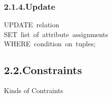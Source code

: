 \documentclass{article}
\begin{document}
\subsubsection{2.1.4.\hspace*{0.5em}Update}\label{sec-update}%
\begin{mdpre}%
\noindent UPDATE~relation\\
SET~list~of~attribute~assignments\\
WHERE~condition~on~tuples;%
\end{mdpre}
\subsection{2.2.\hspace*{0.5em}Constraints}\label{sec-constraints}%

\noindent{}Kinds of Contraints%
\end{document}
